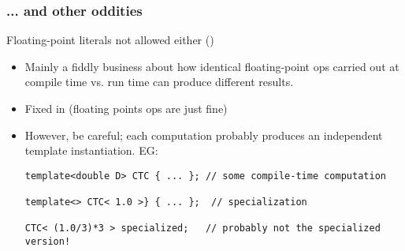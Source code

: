 \begin{frame}[fragile,t]
\frametitle{... and other oddities}

Floating-point literals not allowed either ()
\begin{itemize}[<+->]
 \item Mainly a fiddly business about how identical floating-point ops carried out at compile time vs. run time can produce different results.
 \item Fixed in  (floating points ops are just fine)
 \item However, be careful; each computation probably produces an independent template instantiation.  EG:
{\scriptsize
\begin{verbatim}
template<double D> CTC { ... }; // some compile-time computation

template<> CTC< 1.0 >} { ... };  // specialization

CTC< (1.0/3)*3 > specialized;   // probably not the specialized version!
\end{verbatim}
}

\end{itemize}

\end{frame}



